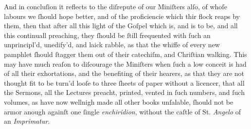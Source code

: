 And in concluſion it reflects to the diſrepute of our Miniſters alſo, of whoſe
labours we ſhould hope better, and of the proficiencie which thir flock reaps by
them, then that after all this light of the Goſpel which is, and is to be, and
all this continuall preaching, they ſhould be ſtill frequented with ſuch an
unprincipl'd, unedify'd, and laick rabble, as that the whiffe of every new
pamphlet ſhould ſtagger them out of their catechiſm, and Chriſtian walking.
This may have much reaſon to diſcourage the Miniſters when ſuch a low conceit is
had of all their exhortations, and the benefiting of their hearers, as that they
are not thought fit to be turn'd looſe to three ſheets of paper without a
licencer, that all the Sermons, all the Lectures preacht, printed, vented in
ſuch numbers, and ſuch volumes, as have now wellnigh made all other books
unſalable, ſhould not be armor anough againſt one ſingle \textit{enchiridion},
without the caſtle of St. \textit{Angelo} of an \textit{Imprimatur}.


